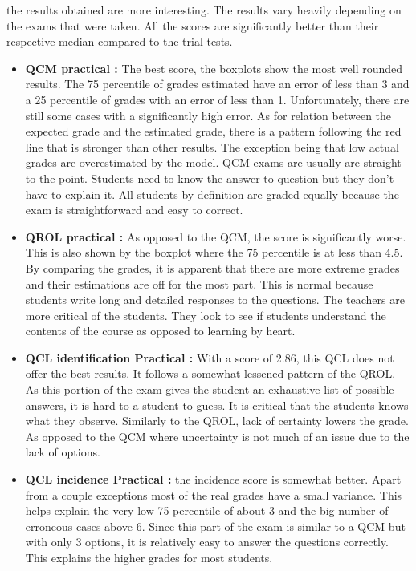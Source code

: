 \documentclass[a4paper,11pt]{report}
\numberwithin{figure}{chapter} %
\begin{document}
	the results obtained are more interesting.
	The results vary heavily depending on the exams that were taken.
	All the scores are significantly better than their respective median compared to the trial tests.
    \begin{itemize}
    \item[\textbullet]  \textbf{QCM practical :} The best score, the boxplots show the most well rounded results.
    The 75 percentile of grades estimated have an error of less than 3 and a 25 percentile of grades with an error of less than 1.
    Unfortunately, there are still some cases with a significantly high error.
    As for relation between the expected grade and the estimated grade, there is a pattern following the red line that is stronger than other results.
    The exception being that low actual grades are overestimated by the model.
    QCM exams are usually are straight to the point.
    Students need to know the answer to question but they don't have to explain it.
    All students by definition are graded equally because the exam is straightforward and easy to correct.
    \item[\textbullet]  \textbf{QROL practical :} As opposed to the QCM, the score is significantly worse.
    This is also shown by the boxplot where the 75 percentile is at less than 4.5. By comparing the grades, it is apparent that there are more extreme grades and their estimations are off for the most part.
    This is normal because students write long and detailed responses to the questions.
    The teachers are more critical of the students.
    They look to see if students understand the contents of the course as opposed to learning by heart.
    \item[\textbullet]  \textbf{QCL identification Practical :} With a score of 2.86, this QCL does not offer the best results.
    It follows a somewhat lessened pattern of the QROL. As this portion of the exam gives the student an exhaustive list of possible answers, it is hard to a student to guess.
    It is critical that the students knows what they observe.
    Similarly to the QROL, lack of certainty lowers the grade.
    As opposed to the QCM where uncertainty is not much of an issue due to the lack of options.
    \item[\textbullet]  \textbf{QCL incidence Practical :} the incidence score  is somewhat better.
    Apart from a couple exceptions most of the real grades have a small variance.
    This helps explain the very low 75 percentile of about 3 and the big number of erroneous cases above 6.
    Since this part of the exam is similar to a QCM but with only 3 options, it is relatively easy to answer the questions correctly.
    This explains the higher grades for most students.
    \end{itemize}
\end{document}
